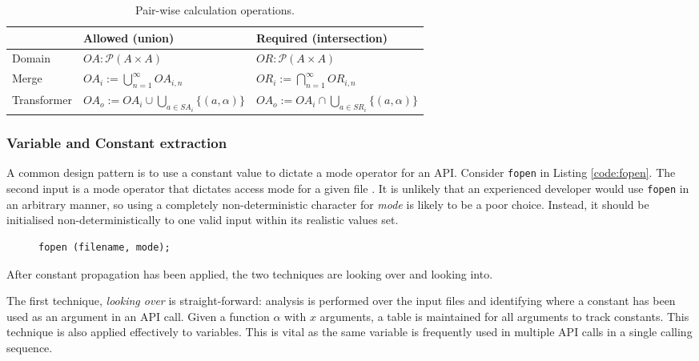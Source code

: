 \documentclass[EPiC]{easychair}
\begin{document}
\begin{table}
	\renewcommand{\arraystretch}{1.4}
	\centering
		\begin{tabular}{|l|l|l|}
		\hline
		& Allowed (union)  &  Required (intersection)\\\hline
		Domain	& $ OA : \mathcal{P}(A \times A)$ &$ OR : \mathcal{P}(A \times A)$ \\
		Merge	& $OA_i := \bigcup_{n=1}^{\infty} OA_{i,n}$ & $OR_i := \bigcap_{n=1}^{\infty} OR_{i,n}$\\
		Transformer	& $OA_o := OA_i \cup \bigcup_{a \in SA_i} \{(a, \alpha)\}$ & $OA_o := OA_i \cap \bigcup_{a \in SR_i} \{(a, \alpha)\}$ \\
		\hline
	\end{tabular}
	\caption{Pair-wise calculation operations. 	\label{tab:pair_wise}}
\end{table}


\subsubsection{Variable and Constant extraction}
A common design pattern is to use a constant value to dictate a mode operator for an API.  Consider \texttt{fopen} in Listing \ref{code:fopen}.  The second input is a mode operator that dictates access mode for a given file \cite{fopen}.  It is unlikely that an experienced developer would use \texttt{fopen} in an arbitrary manner, so using a completely non-deterministic character for \textit{mode} is likely to be a poor choice.  Instead, it should be initialised non-deterministically to one valid input within its realistic values set.  

\begin{wrapfigure}[4]{r}{.35\textwidth}
	\begin{lstlisting}[caption={\texttt{fopen}}, numbers=none, label={code:fopen}]
fopen (filename, mode);
	\end{lstlisting}
\end{wrapfigure}



After constant propagation has been applied, the two techniques are looking over and looking into.

The first technique, \emph{looking over} is straight-forward:  analysis is performed over the input files and identifying where a constant has been used as an argument in an API call.  Given a function $\alpha$ with $x$ arguments, a table is maintained for all arguments to track constants.  
This technique is also applied effectively to variables.  This is vital as the same variable is frequently used in multiple API calls in a single calling sequence.  
\end{document}
